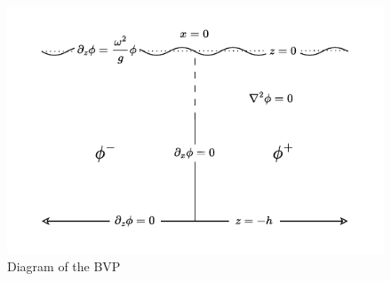 \documentclass[a4paper,12pt]{report}
\begin{document}
\begin{figure}[h]
\centering
\includegraphics[width=12cm]{bvp-figure.pdf}
\caption{Diagram of the BVP}
\label{fig:bvp}
\end{figure}
\end{document}
